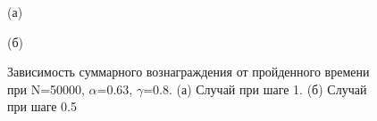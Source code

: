 \documentclass[a4paper]{report}
\theoremstyle{definition}
\theoremstyle{plain}
\theoremstyle{remark}
\theoremstyle{remark}
\theoremstyle{definition}
\begin{document}
\begin{figure}[H]
    \begin{minipage}[H]{0.49\linewidth}
        (а)\\
    \end{minipage}
    \hfill
    \begin{minipage}[H]{0.49\linewidth}
        (б)\\
    \end{minipage}
     \caption{Зависимость суммарного вознаграждения от пройденного времени при N=50000, $\alpha$=0.63, $\gamma$=0.8. (а) Случай при шаге 1. (б) Случай при шаге 0.5}
\end{figure}
\end{document}
